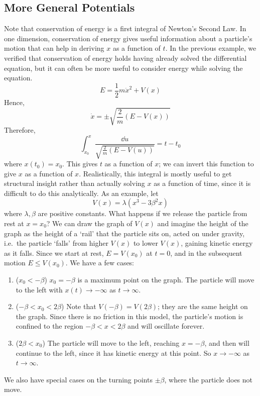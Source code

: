 \subsection{More General Potentials}
Note that conservation of energy is a first integral of Newton's Second Law.
In one dimension, conservation of energy gives useful information about a particle's motion that can help in deriving \(x\) as a function of \(t\).
In the previous example, we verified that conservation of energy holds having already solved the differential equation, but it can often be more useful to consider energy while solving the equation.
\[
	E = \frac{1}{2}m\dot x^2 + V(x)
\]
Hence,
\[
	\dot x = \pm \sqrt{\frac{2}{m}(E - V(x))}
\]
Therefore,
\[
	\int_{x_0}^x \frac{\dd{u}}{\sqrt{\frac{2}{m}(E - V(u))}} = t - t_0
\]
where \(x(t_0) = x_0\).
This gives \(t\) as a function of \(x\); we can invert this function to give \(x\) as a function of \(x\).
Realistically, this integral is mostly useful to get structural insight rather than actually solving \(x\) as a function of time, since it is difficult to do this analytically.
As an example, let
\[
	V(x) = \lambda(x^3 - 3 \beta^2 x)
\]
where \(\lambda, \beta\) are positive constants.
What happens if we release the particle from rest at \(x=x_0\)?
We can draw the graph of \(V(x)\) and imagine the height of the graph as the height of a `rail' that the particle sits on, acted on under gravity, i.e.\ the particle `falls' from higher \(V(x)\) to lower \(V(x)\), gaining kinetic energy as it falls.
Since we start at rest, \(E = V(x_0)\) at \(t=0\), and in the subsequent motion \(E \leq V(x_0)\).
We have a few cases:
\begin{enumerate}[{Case} 1:]
	\item (\(x_0 < -\beta\)) \(x_0 = -\beta\) is a maximum point on the graph.
	      The particle will move to the left with \(x(t) \to -\infty\) as \(t \to \infty\).
	\item (\(-\beta < x_0 < 2\beta\)) Note that \(V(-\beta) = V(2\beta)\); they are the same height on the graph.
	      Since there is no friction in this model, the particle's motion is confined to the region \(-\beta < x < 2\beta\) and will oscillate forever.
	\item (\(2\beta < x_0\)) The particle will move to the left, reaching \(x=-\beta\), and then will continue to the left, since it has kinetic energy at this point.
	      So \(x \to -\infty\) as \(t \to \infty\).
\end{enumerate}
We also have special cases on the turning points \(\pm\beta\), where the particle does not move.
